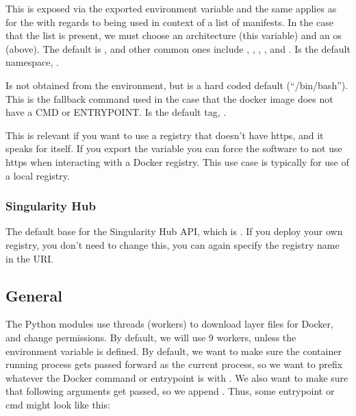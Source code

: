 \documentclass[letterpaper,10pt,english]{sphinxmanual}
\begin{document}
 This is exposed via the exported environment
variable 
and the same applies as for the  with regards to being used in context
of a list of manifests. In the case that the list is present, we must
choose an architecture (this variable) and an os (above). The default
is , and other common ones include , , , , and .
 Is the default namespace, .

 Is not obtained from the environment, but is a
hard coded default (“/bin/bash”). This is the fallback command used in
the case that the docker image does not have a CMD or ENTRYPOINT.
 Is the default tag, .

 This is relevant if you want to use a
registry that doesn’t have https, and it speaks for itself. If you
export the variable  you can force the software to not use https when
interacting with a Docker registry. This use case is typically for use
of a local registry.


\subsubsection{Singularity Hub}
\label{\detokenize{build_environment:singularity-hub}}
 The default base for the Singularity Hub API,
which is . If you deploy your own registry, you don’t need
to change this, you can again specify the registry name in the URI.


\subsection{General}
\label{\detokenize{build_environment:general}}
 The Python modules use threads (workers) to
download layer files for Docker, and change permissions. By default,
we will use 9 workers, unless the environment variable  is defined.
 By default, we want to make sure the
container running process gets passed forward as the current process,
so we want to prefix whatever the Docker command or entrypoint is with
. We also want to make sure that following arguments get passed, so we
append . Thus, some entrypoint or cmd might look like this:
\end{document}

